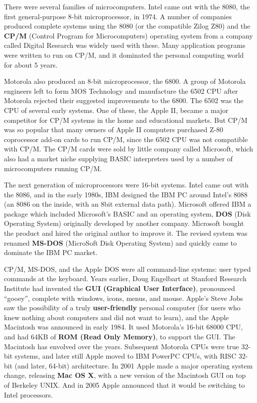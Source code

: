 \documentclass{book}
\newcommand {\kw}  [1] {\textbf{#1}}
\begin{document}
There were several families of microcomputers.
Intel came out with the 8080, the first general-purpose 8-bit microprocessor, in 1974.
A number of companies produced complete systems using the 8080 (or the compatible Zilog Z80) 
and the \kw{CP/M} (Control Program for Microcomputers) operating system from a company called Digital Research was widely used with these.
Many application programs were written to run on CP/M, and it dominated the personal computing world for about 5 years.

Motorola also produced an 8-bit microprocessor, the 6800.
A group of Motorola engineers left to form MOS Technology and manufacture the 6502 CPU after Motorola rejected their suggested improvements to the 6800.
The 6502 was the CPU of several early systems.
One of these, the Apple II, became a major competitor for CP/M systems in the home and educational markets.
But CP/M was so popular that many owners of Apple II computers purchased Z-80 coprocessor add-on cards to run CP/M, 
since the 6502 CPU was not compatible with CP/M.
The CP/M cards were sold by little company called Microsoft, which also had a market niche supplying BASIC interpreters 
used by a number of microcomputers running CP/M.

The next generation of microprocessors were 16-bit systems.
Intel came out with the 8086, and in the early 1980s, IBM designed the IBM PC around Intel's 8088 (an 8086 on the inside, with an 8bit external data path).
Microsoft offered IBM a package which included Microsoft's BASIC and an operating system, 
\kw{DOS} (Disk Operating System) originally developed by another company.
Microsoft bought the product and hired the original author to improve it.
The revised system was renamed \kw{MS-DOS} (MicroSoft Disk Operating System) and quickly came to dominate the IBM PC market.

CP/M, MS-DOS, and the Apple DOS were all command-line systems: user typed commands at the keyboard.
Years earlier, Doug Engelbart at Stanford Research Institute had invented the \kw{GUI (Graphical User Interface)}, pronounced ``gooey'', 
complete with windows, icons, menus, and mouse.
Apple's Steve Jobs saw the possibility of a truly \kw{user-friendly} personal computer 
(for users who knew nothing about computers and did not want to learn), and the Apple Macintosh was announced in early 1984.
It used Motorola's 16-bit 68000 CPU, and had 64KB of \kw{ROM (Read Only Memory)}, to support the GUI.
The Macintosh has envolved over the years.
Subsequent Motorola CPUs were true 32-bit systems, and later still Apple moved to IBM PowerPC CPUs, with RISC 32-bit (and later, 64-bit) architecture.
In 2001 Apple made a major operating system change, releasing \kw{Mac OS X}, with a new version of the Macintosh GUI on top of Berkeley UNIX.
And in 2005 Apple announced that it would be switching to Intel processors.
\end{document}
